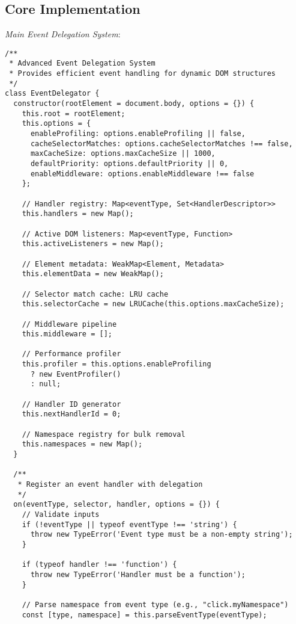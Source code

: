 \documentclass[11pt]{article}
\begin{document}
\subsection{Core Implementation}
\label{sec:orgbf5e653}

\emph{Main Event Delegation System}:

\begin{verbatim}
/**
 * Advanced Event Delegation System
 * Provides efficient event handling for dynamic DOM structures
 */
class EventDelegator {
  constructor(rootElement = document.body, options = {}) {
    this.root = rootElement;
    this.options = {
      enableProfiling: options.enableProfiling || false,
      cacheSelectorMatches: options.cacheSelectorMatches !== false,
      maxCacheSize: options.maxCacheSize || 1000,
      defaultPriority: options.defaultPriority || 0,
      enableMiddleware: options.enableMiddleware !== false
    };
    
    // Handler registry: Map<eventType, Set<HandlerDescriptor>>
    this.handlers = new Map();
    
    // Active DOM listeners: Map<eventType, Function>
    this.activeListeners = new Map();
    
    // Element metadata: WeakMap<Element, Metadata>
    this.elementData = new WeakMap();
    
    // Selector match cache: LRU cache
    this.selectorCache = new LRUCache(this.options.maxCacheSize);
    
    // Middleware pipeline
    this.middleware = [];
    
    // Performance profiler
    this.profiler = this.options.enableProfiling 
      ? new EventProfiler() 
      : null;
    
    // Handler ID generator
    this.nextHandlerId = 0;
    
    // Namespace registry for bulk removal
    this.namespaces = new Map();
  }
  
  /**
   * Register an event handler with delegation
   */
  on(eventType, selector, handler, options = {}) {
    // Validate inputs
    if (!eventType || typeof eventType !== 'string') {
      throw new TypeError('Event type must be a non-empty string');
    }
    
    if (typeof handler !== 'function') {
      throw new TypeError('Handler must be a function');
    }
    
    // Parse namespace from event type (e.g., "click.myNamespace")
    const [type, namespace] = this.parseEventType(eventType);
    

\end{verbatim}
\end{document}
